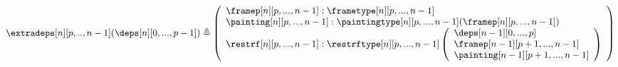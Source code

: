 \documentclass{msc}
\newcommand{\defeq}{\ensuremath{\triangleq}}
\begin{document}
\begin{align*}
  \extradeps[n][p,..,n-1] (\deps[n][0,...,p-1]) \defeq
  \left(\begin{array}{l}
            \framep[n][p,...,n-1] :\frametype[n][p,...,n-1] \\
            \painting[n][p,...,n-1] :\paintingtype[n][p,...,n-1]
            (\framep[n][p,...,n-1])                         \\
            \restrf[n][p,...,n-1]  :\restrftype[n][p,...,n-1]
            \left(\begin{array}{l}
                \deps[n-1][0,...,p]         \\
                \framep[n-1][p+1,...,n-1]   \\
                \painting[n-1][p+1,...,n-1] \\
              \end{array}\right)               \\
          \end{array}\right)
\end{align*}
\end{document}
